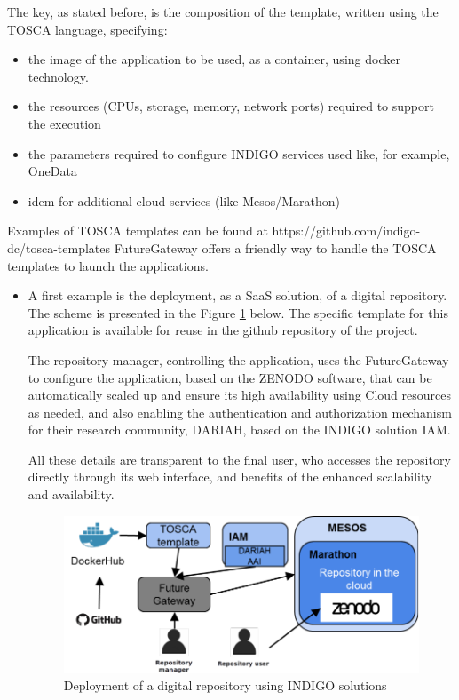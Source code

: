 \documentclass{article}
\begin{document}
{The key, as stated before, is the composition of the template, written using the TOSCA language, specifying:

\begin{itemize}
\item the image of the application to be used, as a container, using docker technology.
\item the resources (CPUs, storage, memory, network ports) required to support the execution
\item the parameters required to configure INDIGO services used like, for example, OneData
\item idem for additional cloud services (like Mesos/Marathon)
\end{itemize}
Examples of TOSCA templates can be found at https://github.com/indigo-dc/tosca-templates FutureGateway offers a friendly way to handle the TOSCA templates to launch the applications.

\begin{itemize}
\item A first example is the deployment, as a SaaS solution, of a digital repository. The scheme is presented in the Figure \ref{fig:13} below. The specific template for this application is available for reuse in the github repository of the project.

The repository manager, controlling the application, uses the FutureGateway to configure the application, based on the ZENODO software, that can be automatically scaled up and ensure its high availability using Cloud resources as needed, and also enabling the authentication and authorization mechanism  for their research community, DARIAH, based on the INDIGO solution IAM. 

All these details are transparent to the final user, who accesses the repository directly through its web interface, and benefits of the enhanced scalability and availability.



\begin{figure}
  \centering
  \includegraphics[width=\textwidth]{./figs/Figure13.pdf}
  \caption{Deployment of a digital repository using INDIGO solutions}
  \label{fig:13}
\end{figure}




\end{itemize}}
\end{document}
